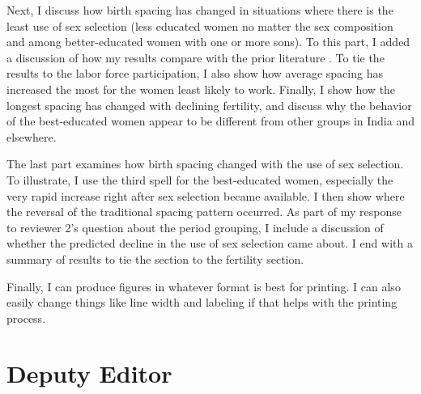 \documentclass[letterpaper,12pt]{article}
\begin{document}
\begin{enumerate}
Next, I discuss how birth spacing has changed in situations where there is the least use
of sex selection (less educated women no matter the sex composition and among 
better-educated women with one or more sons).
To this part, I added a discussion of how my results compare with the prior literature 
\citep{Rutstein2011,Casterline2016}.
To tie the results to the labor force participation, I also show how average spacing
has increased the most for the women least likely to work.
Finally, I show how the longest spacing has changed with declining fertility, and discuss 
why the behavior of the best-educated women appear to be different from other groups in 
India and elsewhere.

The last part examines how birth spacing changed with the use of sex selection.
To illustrate, I use the third spell for the best-educated women, especially the very 
rapid increase right after sex selection became available.
I then show where the reversal of the traditional spacing pattern occurred.
As part of my response to reviewer 2's question about the period grouping, I include a 
discussion of whether the predicted decline in the use of sex selection came about.
I end with a summary of results to tie the section to the fertility section.

Finally, I can produce figures in whatever format is best for printing.
I can also easily change things like line width and labeling if that helps with the
printing process.

\end{enumerate}


\section*{Deputy Editor}
\end{document}
